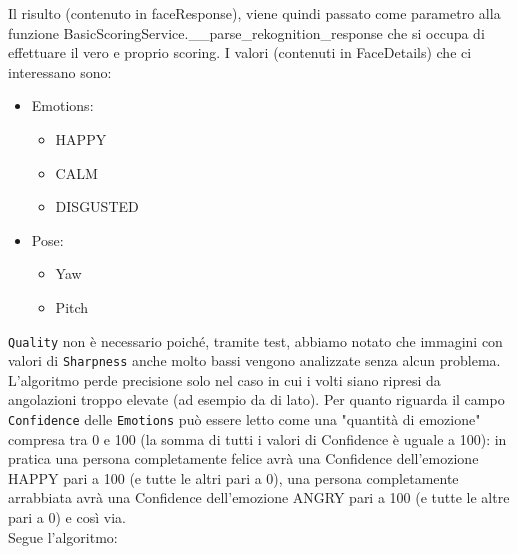 Il risulto (contenuto in faceResponse), viene quindi passato come parametro alla funzione 
BasicScoringService.\_\_parse\_rekognition\_response che si occupa di effettuare il vero
e proprio scoring.
I valori (contenuti in FaceDetails) che ci interessano sono:
\begin{itemize}
    \item Emotions: \begin{itemize}
        \item HAPPY
        \item CALM
        \item DISGUSTED \end{itemize}
    \item Pose: \begin{itemize}
        \item Yaw
        \item Pitch \end{itemize}
\end{itemize}
\verb+Quality+ non è necessario poiché, tramite test, abbiamo notato che immagini con valori di 
\verb+Sharpness+ anche molto bassi vengono analizzate senza alcun problema. L'algoritmo perde precisione
solo nel caso in cui i volti siano ripresi da angolazioni troppo elevate (ad esempio da di lato).
Per quanto riguarda il campo \verb+Confidence+ delle \verb+Emotions+ può essere letto come una
"quantità di emozione" compresa tra 0 e 100 (la somma di tutti i valori di Confidence è uguale a 100):
in pratica una persona completamente felice avrà una Confidence dell'emozione HAPPY pari a 100 
(e tutte le altri pari a 0), una persona completamente arrabbiata avrà una Confidence 
dell'emozione ANGRY pari a 100 (e tutte le altre pari a 0) e così via.\\
Segue l'algoritmo: 
